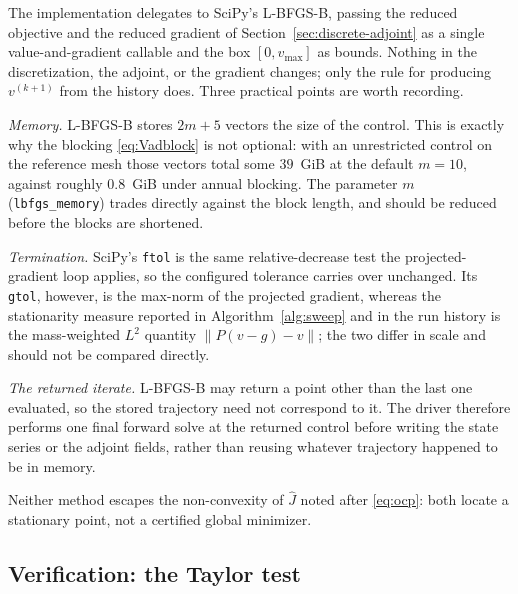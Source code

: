 \documentclass[11pt]{article}
\begin{document}
The implementation delegates to SciPy's L-BFGS-B, passing the reduced objective and the reduced gradient of Section~\ref{sec:discrete-adjoint} as a single value-and-gradient callable and the box $[0,v_{\max}]$ as bounds. Nothing in the discretization, the adjoint, or the gradient changes; only the rule for producing $v^{(k+1)}$ from the history does. Three practical points are worth recording.

\emph{Memory.} L-BFGS-B stores $2m+5$ vectors the size of the control. This is exactly why the blocking \eqref{eq:Vadblock} is not optional: with an unrestricted control on the reference mesh those vectors total some $39$~GiB at the default $m=10$, against roughly $0.8$~GiB under annual blocking. The parameter $m$ (\texttt{lbfgs\_memory}) trades directly against the block length, and should be reduced before the blocks are shortened.

\emph{Termination.} SciPy's \texttt{ftol} is the same relative-decrease test the projected-gradient loop applies, so the configured tolerance carries over unchanged. Its \texttt{gtol}, however, is the max-norm of the projected gradient, whereas the stationarity measure reported in Algorithm~\ref{alg:sweep} and in the run history is the mass-weighted $L^2$ quantity $\lVert P(v-g)-v\rVert$; the two differ in scale and should not be compared directly.

\emph{The returned iterate.} L-BFGS-B may return a point other than the last one evaluated, so the stored trajectory need not correspond to it. The driver therefore performs one final forward solve at the returned control before writing the state series or the adjoint fields, rather than reusing whatever trajectory happened to be in memory.

Neither method escapes the non-convexity of $\hat J$ noted after \eqref{eq:ocp}: both locate a stationary point, not a certified global minimizer.

\subsection{Verification: the Taylor test}
\label{sec:verification}
\end{document}
